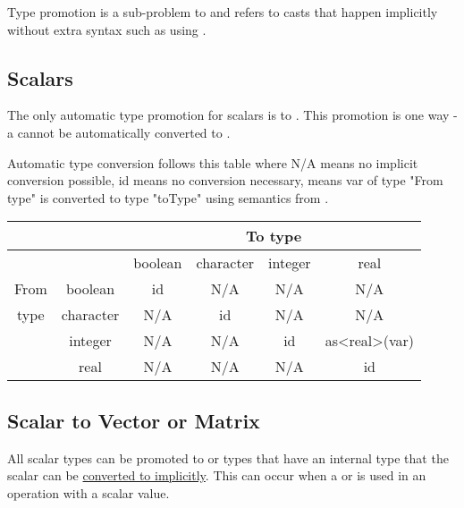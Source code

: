 \documentclass[../gazprea.tex]{subfiles}
\begin{document}
Type promotion is a sub-problem to  and refers to casts that happen
implicitly without extra syntax such as using .


\subsection{Scalars}
\label{ssec:typePromotion_scalar}
The only automatic type promotion for scalars is  to . This promotion is
one way - a  cannot be automatically converted to .

Automatic type conversion follows this table where N/A means no implicit conversion possible, id
means no conversion necessary,  means var of type "From type" is converted to
type "toType" using semantics from .
\begin{center}
\begin{tabular}{| c | c | c | c | c | c |}
  \hline
         &           & \multicolumn{4}{c}{To type} \\ \hline
         &           & boolean & character & integer & real          \\ \cline{2-6}
    From & boolean   & id      & N/A       & N/A     & N/A           \\ \cline{2-6}
    type & character & N/A     & id        & N/A     & N/A           \\ \cline{2-6}
         & integer   & N/A     & N/A       & id      & as<real>(var) \\ \cline{2-6}
         & real      & N/A     & N/A       & N/A     & id            \\ \hline
\end{tabular}
\end{center}

\subsection{Scalar to Vector or Matrix}
\label{ssec:typePromotion_stov}
All scalar types can be promoted to  or  types that have an internal type
that the scalar can be \hyperref[ssec:typePromotion_scalar]{converted to implicitly}. This can occur
when a  or  is used in an operation with a scalar value.
\end{document}
